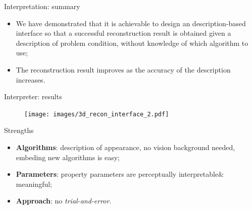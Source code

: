 \documentclass[10pt]{beamer}
\begin{document}
\begin{frame}{Interpretation: summary}

\begin{exampleblock}{}
\begin{itemize}
\item We have demonstrated that it is achievable to design an description-based interface so that a successful reconstruction result is obtained given a description of problem condition, without knowledge of which algorithm to use;
\item The reconstruction result improves as the accuracy of the description increases.
\end{itemize}
\end{exampleblock}

\end{frame}

\begin{frame}{Interpreter: results}

\begin{figure}
\centering
\texttt{[image: images/3d\_recon\_interface\_2.pdf]}
\end{figure}

\begin{exampleblock}{Strengths}
  \begin{itemize}
    \item \textbf{Algorithms}: description of appearance, no vision background needed, embeding new algorithms is easy;
    \item \textbf{Parameters}: property parameters are perceptually interpretable\& meaningful;
    \item \textbf{Approach}: no \textit{trial-and-error}.
  \end{itemize}
\end{exampleblock}

\end{frame}

\end{document}
